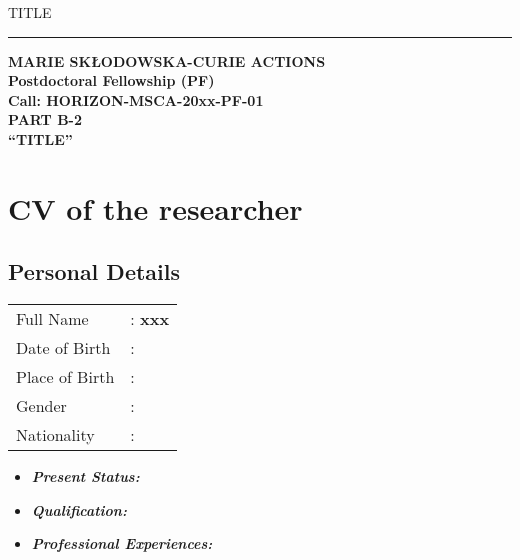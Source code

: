 \documentclass[a4paper,11pt,Times New Roman]{article}
\begin{document}
\begin{titlepage}

\vspace{5cm}
\par
\begin{center}
TITLE
\vspace{0.3cm}
\hrule
\vspace{2cm}
{\Large \textbf{MARIE SK\L{}ODOWSKA-CURIE ACTIONS}}\\
\vspace{2cm}
\textbf{Postdoctoral Fellowship (PF)}\\
\vspace{0.5cm}
\textbf{Call: HORIZON-MSCA-20xx-PF-01}\\
\vspace{4cm}
{\Large \textbf{PART B-2}}\\
\vspace{3cm}
{\large \textbf{``TITLE''}}
\end{center}
\end{titlepage}
\tableofcontents

\newpage
	
\section{CV of the researcher }
\subsection{Personal Details}
\begin{tabular}{@{}p{1.5in}p{6in}}
\hspace{1cm}		Full Name     &: \textbf{xxx}\\
\hspace{1cm}		Date of Birth &: \\
\hspace{1cm}		Place of Birth &: \\
\hspace{1cm}		Gender        &: \\
\hspace{1cm}		Nationality   &: 
\end{tabular}
\begin{itemize}
\item \textbf{ \textit{Present Status:}} 
\item \textbf{ \textit{Qualification:}} 
\item \textbf{ \textit{Professional Experiences:}} 
\end{itemize}
\end{document}
